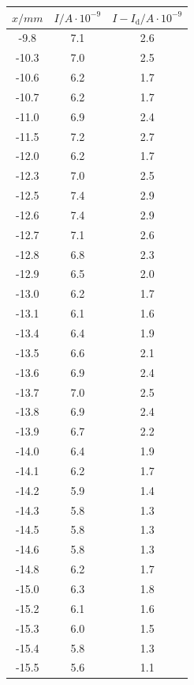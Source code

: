 \begin{table}
\begin{minipage}{0.46\textwidth}
    \centering
	\begin{tabular}{c|c|c}
		\toprule
		{$x / mm$} & {$I / A\cdot10^{-9}$}& {$I - I_\text{d} / A\cdot10^{-9}$} \\
		\hline
        \midrule
        -9.8 &7.1&2.6\\
        -10.3 &7.0&2.5\\
        -10.6 &6.2&1.7\\
        -10.7 &6.2&1.7\\
        -11.0 &6.9&2.4\\
        -11.5 &7.2&2.7\\
        -12.0 &6.2&1.7\\
        -12.3 &7.0&2.5\\
        -12.5 &7.4&2.9\\
        -12.6 &7.4&2.9\\
        -12.7 &7.1&2.6\\
        -12.8 &6.8&2.3\\
        -12.9 &6.5&2.0\\
        -13.0 &6.2&1.7\\
        -13.1 &6.1&1.6\\
        -13.4 &6.4&1.9\\
        -13.5 &6.6&2.1\\
        -13.6 &6.9&2.4\\
        -13.7 &7.0&2.5\\
        -13.8 &6.9&2.4\\
        -13.9 &6.7&2.2\\
        -14.0 &6.4&1.9\\
        -14.1 &6.2&1.7\\
        -14.2 &5.9&1.4\\
        -14.3 &5.8&1.3\\
        -14.5 &5.8&1.3\\
        -14.6 &5.8&1.3\\
        -14.8 &6.2&1.7\\
        -15.0 &6.3&1.8\\
        -15.2 &6.1&1.6\\
        -15.3 &6.0&1.5\\
        -15.4 &5.8&1.3\\
        -15.5 &5.6&1.1\\
		\bottomrule 
	\end{tabular}
\end{minipage}
\end{table}

